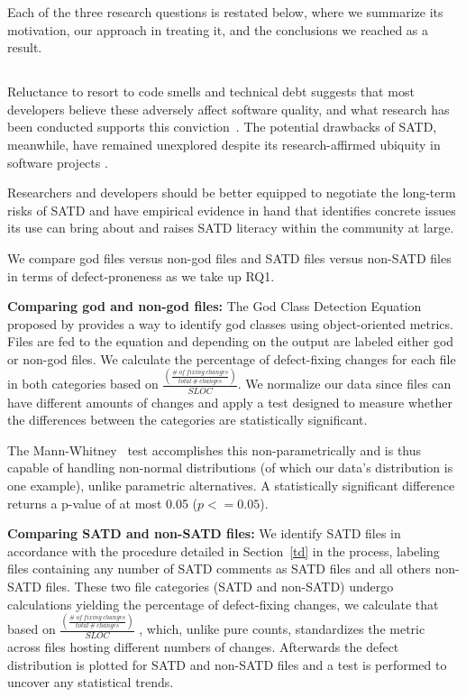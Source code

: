 Each of the three research questions is restated below, where we summarize its motivation, our approach in treating it, and the conclusions we reached as a result.

\subsection*{\chapterIVrqI}


Reluctance to resort to code smells and  technical debt suggests that most developers believe these adversely affect software quality, and what research has been conducted supports this conviction~\cite{zazworka2011investigating}.  The potential drawbacks of SATD, meanwhile, have remained unexplored despite its research-affirmed ubiquity in software projects \cite{ICSM_PotdarS14}.

Researchers and developers should be better equipped to negotiate the long-term risks of SATD and have empirical evidence in hand that identifies concrete issues its use can bring about and raises SATD literacy within the community at large.


We compare god files versus non-god files and SATD files versus non-SATD files in terms of defect-proneness as we take up RQ1.


\noindent\textbf{Comparing god and non-god files:}
The God Class Detection Equation proposed by \cite{marinescu2004detection} provides a way to identify god classes using object-oriented metrics. Files are fed to the equation and depending on the output are labeled either god or non-god files. We calculate the percentage of defect-fixing changes for each file in both categories based on $\frac{\left (\frac{\#~of~fixing~changes}{total~\#~changes} \right )}{SLOC}$. We normalize our data since files can have different amounts of changes and apply a test designed to measure whether the differences between the categories are statistically significant.

The Mann-Whitney~\cite{mann1947test} test accomplishes this non-parametrically and is thus capable of handling non-normal distributions (of which our data's distribution is one example), unlike parametric alternatives. A statistically significant difference returns a p-value of at most 0.05 ($p <= 0.05$).


\noindent\textbf{Comparing SATD and non-SATD files:}
We identify SATD files in accordance with the procedure detailed in Section~\ref{td} in the process, labeling files containing any number of SATD comments as SATD files and all others non-SATD files. These two file categories (SATD and non-SATD) undergo calculations yielding the percentage of defect-fixing changes, we calculate that based on $\frac{\left (\frac{\#~of~fixing~changes}{total~\#~changes} \right )}{SLOC}$ , which, unlike pure counts, standardizes the metric across files hosting different numbers of changes. Afterwards the defect distribution is plotted for SATD and non-SATD files and a test is performed to uncover any statistical trends.

